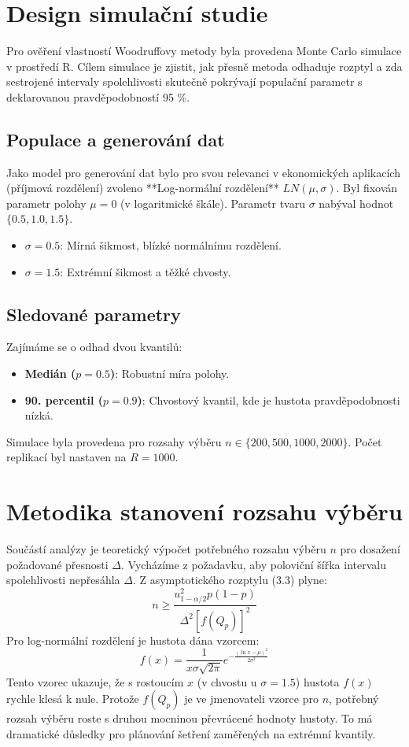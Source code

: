 \section{Design simulační studie}
Pro ověření vlastností Woodruffovy metody byla provedena Monte Carlo simulace v prostředí R. Cílem simulace je zjistit, jak přesně metoda odhaduje rozptyl a zda sestrojené intervaly spolehlivosti skutečně pokrývají populační parametr s deklarovanou pravděpodobností 95 \%.

\subsection{Populace a generování dat}
Jako model pro generování dat bylo pro svou relevanci v ekonomických aplikacích (příjmová rozdělení) zvoleno **Log-normální rozdělení** $LN(\mu, \sigma)$.
Byl fixován parametr polohy $\mu = 0$ (v logaritmické škále).
Parametr tvaru $\sigma$ nabýval hodnot $\{0.5, 1.0, 1.5\}$.
\begin{itemize}
    \item $\sigma=0.5$: Mírná šikmost, blízké normálnímu rozdělení.
    \item $\sigma=1.5$: Extrémní šikmost a těžké chvosty.
\end{itemize}

\subsection{Sledované parametry}
Zajímáme se o odhad dvou kvantilů:
\begin{itemize}
    \item \textbf{Medián ($p=0.5$)}: Robustní míra polohy.
    \item \textbf{90. percentil ($p=0.9$)}: Chvostový kvantil, kde je hustota pravděpodobnosti nízká.
\end{itemize}
Simulace byla provedena pro rozsahy výběru $n \in \{200, 500, 1000, 2000\}$. Počet replikací byl nastaven na $R=1000$.

\section{Metodika stanovení rozsahu výběru}
Součástí analýzy je teoretický výpočet potřebného rozsahu výběru $n$ pro dosažení požadované přesnosti $\Delta$. Vycházíme z požadavku, aby poloviční šířka intervalu spolehlivosti nepřesáhla $\Delta$.
Z asymptotického rozptylu (3.3) plyne:
\begin{equation}
n \ge \frac{u_{1-\alpha/2}^2 p(1-p)}{\Delta^2 [f(Q_p)]^2}
\end{equation}
Pro log-normální rozdělení je hustota dána vzorcem:
\begin{equation}
f(x) = \frac{1}{x\sigma\sqrt{2\pi}} e^{-\frac{(\ln x - \mu)^2}{2\sigma^2}}
\end{equation}
Tento vzorec ukazuje, že s rostoucím $x$ (v chvostu u $\sigma=1.5$) hustota $f(x)$ rychle klesá k nule. Protože $f(Q_p)$ je ve jmenovateli vzorce pro $n$, potřebný rozsah výběru roste s druhou mocninou převrácené hodnoty hustoty. To má dramatické důsledky pro plánování šetření zaměřených na extrémní kvantily.
